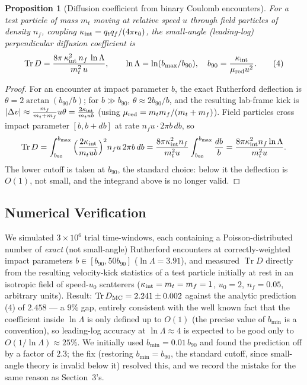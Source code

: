 \documentclass[12pt]{amsart}
\theoremstyle{plain}
\newtheorem{proposition}[theorem]{Proposition}
\theoremstyle{remark}
\begin{document}
\begin{proposition}[Diffusion coefficient from binary Coulomb encounters]\label{prop:plasmaD}
For a test particle of mass $m_t$ moving at relative speed $u$ through field particles of density $n_f$, coupling $\kappa_{\rm int}=q_tq_f/(4\pi\epsilon_0)$, the small-angle (leading-log) perpendicular diffusion coefficient is
\begin{equation}
\operatorname{Tr}D = \frac{8\pi\,\kappa_{\rm int}^2\,n_f\,\ln\Lambda}{m_t^2\,u}, \qquad \ln\Lambda=\ln(b_{\max}/b_{90}),\quad b_{90}=\frac{\kappa_{\rm int}}{\mu_{\rm red}u^2}. \tag{4}
\end{equation}
\end{proposition}

\begin{proof}
For an encounter at impact parameter $b$, the exact Rutherford deflection is $\theta=2\arctan(b_{90}/b)$; for $b\gg b_{90}$, $\theta\approx2b_{90}/b$, and the resulting lab-frame kick is $|\Delta v|\approx\frac{m_f}{m_t+m_f}u\theta=\frac{2\kappa_{\rm int}}{m_t u b}$ (using $\mu_{\rm red}=m_tm_f/(m_t+m_f)$). Field particles cross impact parameter $[b,b+db]$ at rate $n_fu\cdot2\pi b\,db$, so
\[
\operatorname{Tr}D=\int_{b_{90}}^{b_{\max}}\Big(\frac{2\kappa_{\rm int}}{m_tub}\Big)^2n_fu\,2\pi b\,db=\frac{8\pi\kappa_{\rm int}^2n_f}{m_t^2u}\int_{b_{90}}^{b_{\max}}\frac{db}{b}=\frac{8\pi\kappa_{\rm int}^2n_f\ln\Lambda}{m_t^2u}. \qedhere
\]
The lower cutoff is taken at $b_{90}$, the standard choice: below it the deflection is $O(1)$, not small, and the integrand above is no longer valid.
\end{proof}

\subsection*{Numerical Verification}
We simulated $3\times10^6$ trial time-windows, each containing a Poisson-distributed number of \emph{exact} (not small-angle) Rutherford encounters at correctly-weighted impact parameters $b\in[b_{90},50b_{90}]$ ($\ln\Lambda=3.91$), and measured $\operatorname{Tr}D$ directly from the resulting velocity-kick statistics of a test particle initially at rest in an isotropic field of speed-$u_0$ scatterers ($\kappa_{\rm int}=m_t=m_f=1$, $u_0=2$, $n_f=0.05$, arbitrary units). Result: $\operatorname{Tr}D_{\rm MC}=2.241\pm0.002$ against the analytic prediction (4) of $2.458$ --- a $9\%$ gap, entirely consistent with the well known fact that the coefficient inside $\ln\Lambda$ is only defined up to $O(1)$ (the precise value of $b_{\min}$ is a convention), so leading-log accuracy at $\ln\Lambda\approx4$ is expected to be good only to $O(1/\ln\Lambda)\approx25\%$. We initially used $b_{\min}=0.01\,b_{90}$ and found the prediction off by a factor of $2.3$; the fix (restoring $b_{\min}=b_{90}$, the standard cutoff, since small-angle theory is invalid below it) resolved this, and we record the mistake for the same reason as Section~3's.
\end{document}
